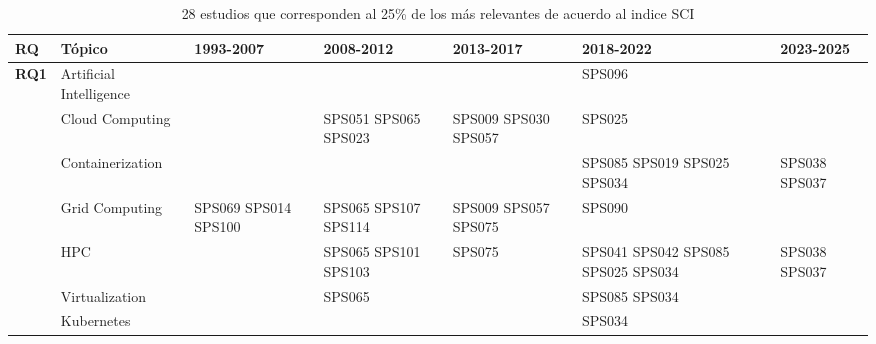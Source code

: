\begin{table*}[htbp]
	\centering
	\caption{28 estudios que corresponden al 25\% de los más relevantes de acuerdo al indice SCI}
	\label{table:highest_SCI}
	\renewcommand{\arraystretch}{1.2}
	\setlength{\tabcolsep}{6pt}
	\begin{tabularx}{\textwidth}{p{0.8cm}p{2.5cm}>{\raggedright\arraybackslash}X>{\raggedright\arraybackslash}X>{\raggedright\arraybackslash}X>{\raggedright\arraybackslash}X>{\raggedright\arraybackslash}X}
		\toprule
		\textbf{RQ}                          & \textbf{Tópico}         & \textbf{1993-2007}   & \textbf{2008-2012}   & \textbf{2013-2017}   & \textbf{2018-2022}                 & \textbf{2023-2025} \\
		\midrule
		\multirow{12}{*}[0em]{\textbf{RQ1}}  & Artificial Intelligence &                      &                      &                      & SPS096                             &                    \\
		\addlinespace[0.3em]
		                                     & Cloud Computing         &                      & SPS051 SPS065 SPS023 & SPS009 SPS030 SPS057 & SPS025                             &                    \\
		\addlinespace[0.3em]
		                                     & Containerization        &                      &                      &                      & SPS085 SPS019 SPS025 SPS034        & SPS038 SPS037      \\
		\addlinespace[0.3em]
		                                     & Grid Computing          & SPS069 SPS014 SPS100 & SPS065 SPS107 SPS114 & SPS009 SPS057 SPS075 & SPS090                             &                    \\
		\addlinespace[0.3em]
		                                     & HPC                     &                      & SPS065 SPS101 SPS103 & SPS075               & SPS041 SPS042 SPS085 SPS025 SPS034 & SPS038 SPS037      \\
		\addlinespace[0.3em]
		                                     & Virtualization          &                      & SPS065               &                      & SPS085 SPS034                      &                    \\
		\addlinespace[0.3em]
		                                     & Kubernetes              &                      &                      &                      & SPS034                             &                    \\

\end{tabularx}
\end{table*}
